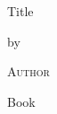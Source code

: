 \documentclass[
 12pt,                %
 a4paper              %
]{book}
\begin{document}
 \begin{titlepage}
  \begin{center}
   \vspace*{1cm}
   \vspace{4\baselineskip}

   {
    \Huge
    Title\par
   }

   \vspace{2.5\baselineskip}

   by\par

   {
    \Large\textsc{Author}\par
   }
  \end{center}
 \end{titlepage}

 \CustomToC           %

 Book
\end{document}
